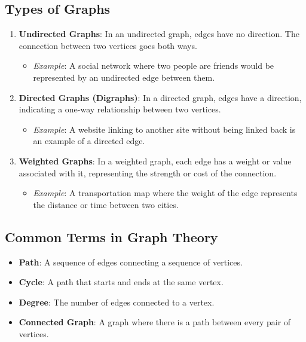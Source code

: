 \subsection{Types of Graphs}
\begin{enumerate}
    \item \textbf{Undirected Graphs}: In an undirected graph, edges have no direction. The connection between two vertices goes both ways.
    \begin{itemize}
        \item \textit{Example}: A social network where two people are friends would be represented by an undirected edge between them.
    \end{itemize}
    \item \textbf{Directed Graphs (Digraphs)}: In a directed graph, edges have a direction, indicating a one-way relationship between two vertices.
    \begin{itemize}
        \item \textit{Example}: A website linking to another site without being linked back is an example of a directed edge.
    \end{itemize}
    \item \textbf{Weighted Graphs}: In a weighted graph, each edge has a weight or value associated with it, representing the strength or cost of the connection.
    \begin{itemize}
        \item \textit{Example}: A transportation map where the weight of the edge represents the distance or time between two cities.
    \end{itemize}
\end{enumerate}

\subsection{Common Terms in Graph Theory}
\begin{itemize}
    \item \textbf{Path}: A sequence of edges connecting a sequence of vertices.
    \item \textbf{Cycle}: A path that starts and ends at the same vertex.
    \item \textbf{Degree}: The number of edges connected to a vertex.
    \item \textbf{Connected Graph}: A graph where there is a path between every pair of vertices.
\end{itemize}

